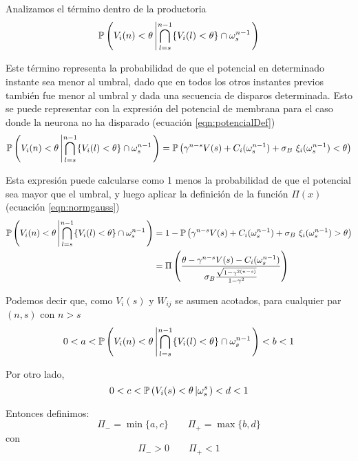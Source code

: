 Analizamos el término dentro de la productoria
\begin{equation*}
     \mathbb{P}\left( V_i(n) < \theta \left|  \bigcap_{l=s}^{n-1} \{ V_i(l) < \theta \} \cap \omega_s^{n-1} \right. \right)
\end{equation*}

Este término representa la probabilidad de que el potencial en determinado instante sea menor al umbral, dado que en todos los otros instantes previos también fue menor al umbral y dada una secuencia de disparos determinada.
Esto se puede representar con la expresión del potencial de membrana para el caso donde la neurona no ha disparado (ecuación \eqref{eqn:potencialDef})
\begin{equation*}
     \mathbb{P}\left( V_i(n) < \theta \left|  \bigcap_{l=s}^{n-1} \{ V_i(l) < \theta \} \cap \omega_s^{n-1} \right. \right) =
    \mathbb{P}\left( \gamma^{n-s} V(s) + C_i(\omega_s^{n-1}) + \sigma_B \  \xi_i(\omega_s^{n-1}) < \theta \right)
\end{equation*}

Esta expresión puede calcularse como 1 menos la probabilidad de que el potencial sea mayor que el umbral, y luego aplicar la definición de la función $\Pi(x)$ (ecuación \eqref{eqn:normgauss})
\begin{align*}
     \mathbb{P}\left( V_i(n) < \theta \left|  \bigcap_{l=s}^{n-1} \{ V_i(l) < \theta \} \cap \omega_s^{n-1} \right.\right) & =  1-  \mathbb{P}\left( \gamma^{n-s} V(s) + C_i(\omega_s^{n-1}) + \sigma_B \  \xi_i(\omega_s^{n-1}) > \theta \right) \\
     & =  \Pi\left(\frac{\theta - \gamma^{n-s} V(s) - C_i(\omega_s^{n-1})}{\sigma_B \frac{\sqrt{1-\gamma^{2(n-s)}}}{1-\gamma^2}} \right)
\end{align*}

Podemos decir que, como $V_i(s)$ y $W_{ij}$ se asumen acotados, para cualquier par $(n,s)$ con $n>s$
\begin{equation*}
     0 < a <\mathbb{P}\left( V_i(n) < \theta \left|  \bigcap_{l=s}^{n-1} \{ V_i(l) < \theta \} \cap \omega_s^{n-1} \right. \right) <b<1
\end{equation*}

Por otro lado, 
\begin{equation*}
     0 < c <\mathbb{P}\left( V_i(s) < \theta \left|  \omega_s^s \right.\right) <d<1
\end{equation*}

Entonces definimos:
\begin{equation}
    \Pi_- = \min\{a,c\} \qquad \Pi_+ = \max\{b,d\}
\end{equation}
con
\begin{equation}
    \Pi_- > 0  \qquad \Pi_+ <1
\end{equation}



